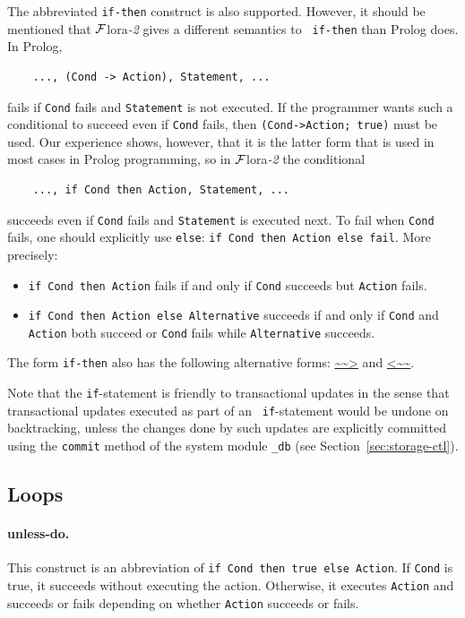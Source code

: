 \documentclass[11pt]{article}
\newcommand{\FLORA}{{\mbox{\sc ${\cal F}${lora}\rm\emph{-2}}}\xspace}
\begin{document}
The abbreviated {\tt if-then} construct is also supported.  However, it
should be mentioned that \FLORA gives a different semantics to {\tt
  if-then} than Prolog does. In Prolog,
\begin{verbatim}
    ..., (Cond -> Action), Statement, ...  
\end{verbatim}
fails if {\tt Cond} fails and {\tt Statement} is not executed. If the
programmer wants such a conditional to succeed even if {\tt Cond} fails, then
{\tt (Cond->Action; true)} must be used. Our experience shows, however,
that it is the latter form that is used in most cases in Prolog
programming, so in \FLORA the conditional
\begin{verbatim}
    ..., if Cond then Action, Statement, ...  
\end{verbatim}
succeeds even if {\tt Cond} fails and {\tt Statement} is executed next. To
fail when {\tt Cond} fails, one should explicitly use {\tt else}:
{\tt if Cond then Action else fail}. More precisely:
\begin{itemize}
  \item  {\tt if Cond then Action} fails if and only if {\tt Cond} succeeds
    but {\tt Action} fails.
  \item {\tt if Cond then Action else Alternative} succeeds if and only if 
    {\tt Cond} and {\tt Action} both succeed or {\tt Cond} fails while
    {\tt Alternative} succeeds.
\end{itemize}
\index{\url{~~>}}
\index{\url{<~~}}
The form {\tt if-then} also has the following alternative forms: \url{~~>}
and \url{<~~}.

Note that the {\tt if}-statement is friendly to transactional updates in
the sense that transactional updates executed as part of an {\tt
  if}-statement would be undone on backtracking, unless the changes done by
such updates are explicitly committed using the {\tt commit} method of the
system module {\tt \_db} (see Section~\ref{sec:storage-ctl}).

\subsection{Loops}
\paragraph{unless-do.}
This construct is an abbreviation of {\tt if Cond then true else Action}.
If {\tt Cond} is true, it succeeds without executing the action.
Otherwise, it executes {\tt Action} and succeeds or fails depending on
whether {\tt Action} succeeds or fails.
\end{document}
